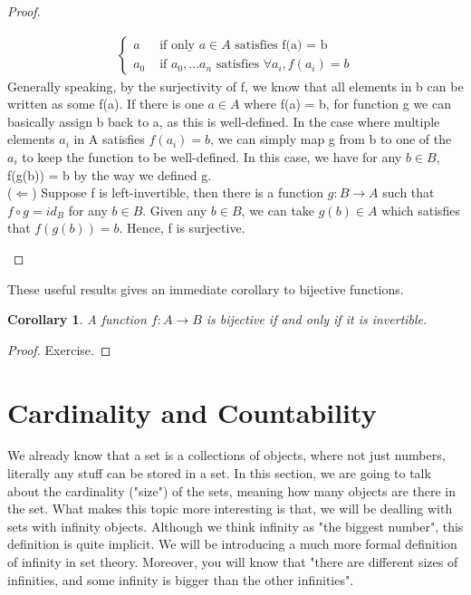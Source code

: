 \documentclass{book}
\newtheorem{corollary}[theorem]{Corollary}
\begin{document}
\begin{proof}
\begin{itemize}[itemsep = 0pt]
\begin{align*}
            \begin{cases}
                a & \text{ if only } a \in A \text{ satisfies f(a) = b} \\
                a_{0} & \text{ if } a_{0}, ... a_{n} \text{ satisfies } \forall a_{i}, f(a_{i}) = b
            \end{cases}
        \end{align*}
        Generally speaking, by the surjectivity of f, we know that all elements in b can be written as some f(a). If there is one $a \in A$ where f(a) = b, for function g we can basically assign b back to a, as this is well-defined. In the case where multiple elements $a_{i}$ in A satisfies $f(a_{i}) = b$, we can simply map g from b to one of the $a_{i}$ to keep the function to be well-defined.
        In this case, we have for any $b \in B$, f(g(b)) = b by the way we defined g. \\
        ($\Leftarrow$) Suppose f is left-invertible, then there is a function $g : B \rightarrow A$ such that $f \circ g = id_{B}$ for any $b \in B$. Given any $b \in B$, we can take $g(b) \in A$ which satisfies that $f(g(b)) = b$. Hence, f is surjective.
    \end{itemize}
\end{proof}

These useful results gives an immediate corollary to bijective functions.

\begin{corollary}
    A function $f : A \rightarrow B$ is bijective if and only if it is invertible.
\end{corollary}

\begin{proof}
    Exercise.
\end{proof}

\section{Cardinality and Countability}
We already know that a set is a collections of objects, where not just numbers, literally any stuff can be stored in a set. In this section, we are going to talk about the cardinality ("size") of the sets, meaning how many objects are there in the set. What makes this topic more interesting is that, we will be dealling with sets with infinity objects. Although we think infinity as "the biggest number", this definition is quite implicit. We will be introducing a much more formal definition of infinity in set theory. Moreover, you will know that "there are different sizes of infinities, and some infinity is bigger than the other infinities".
\end{document}
